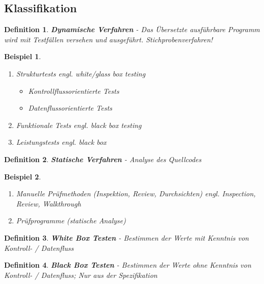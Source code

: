 \documentclass[a4paper]{article}
\theoremstyle{break}
\newtheorem{defi}{Definition}[section]
\newtheorem{ex}{Beispiel}[section]
\begin{document}
        \subsection{Klassifikation}
        \begin{defi}
          \textbf{Dynamische Verfahren} - Das Übersetzte ausführbare Programm wird mit Testfällen versehen und ausgeführt. Stichprobenverfahren!
        \end{defi}
        \begin {ex}
          \begin{enumerate}
          \item Strukturtests \textit{engl. white/glass box testing}
            \begin{itemize}
            \item Kontrollflussorientierte Tests
            \item Datenflussorientierte Tests
            \end{itemize}
          \item Funktionale Tests \textit{engl. black box testing}
          \item Leistungstests \textit{engl. black box}
          \end {enumerate}
        \end{ex}

        \begin{defi}
          \textbf{Statische Verfahren} - Analyse des Quellcodes
        \end{defi}
        \begin{ex}
          \begin {enumerate}
          \item Manuelle Prüfmethoden (Inspektion, Review, Durchsichten) \textit{engl. Inspection, Review, Walkthrough}
          \item Prüfprogramme (statische Analyse)
          \end{enumerate}
        \end{ex}

        \begin{defi}
          \textbf{White Box Testen} - Bestimmen der Werte mit Kenntnis von Kontroll- / Datenfluss
        \end{defi}

        \begin{defi}
          \textbf{Black Box Testen} - Bestimmen der Werte ohne Kenntnis von Kontroll- / Datenfluss; Nur aus der Spezifikation
        \end{defi}
        
\end{document}
